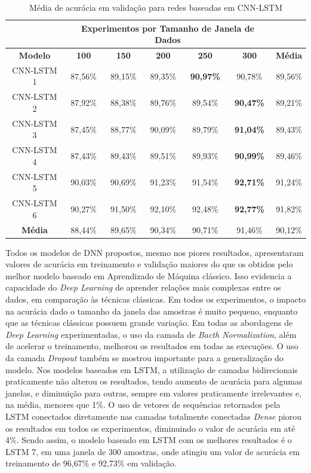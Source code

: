 \begin{table}[H]
\scriptsize
\centering
\caption{Média de acurácia em validação para redes baseadas em CNN-LSTM} 
\label{table:cnn_lstm_results_tipo_superficie_1}
\begin{tabular}{ccccccc}
\cmidrule(lr){2-6}
& \multicolumn{5}{c}{\textbf{Experimentos por Tamanho de Janela de Dados}} & \multicolumn{1}{c}{} \\ \midrule
\textbf{Modelo} & \textbf{100} & \textbf{150} & \textbf{200} & \textbf{250} & \textbf{300} & \textbf{Média} \\ \midrule
CNN-LSTM 1 & 87,56\% & 89,15\% & 89,35\% & \textbf{90,97\%} & 90,78\% & 89,56\% \\ \midrule
CNN-LSTM 2 & 87,92\% & 88,38\% & 89,76\% & 89,54\% & \textbf{90,47\%} & 89,21\% \\ \midrule
CNN-LSTM 3 & 87,45\% & 88,77\% & 90,09\% & 89,79\% & \textbf{91,04\%} & 89,43\% \\ \midrule
CNN-LSTM 4 & 87,43\% & 89,43\% & 89,51\% & 89,93\% & \textbf{90,99\%} & 89,46\% \\ \midrule
CNN-LSTM 5 & 90,03\% & 90,69\% & 91,23\% & 91,54\% & \textbf{92,71\%} & 91,24\% \\ \midrule
CNN-LSTM 6 & 90,27\% & 91,50\% & 92,10\% & 92,48\% &\cellcolor[HTML]{34FF34}\textbf{92,77\%} & 91,82\% \\ \midrule
\textbf{Média} & 88,44\% & 89,65\% & 90,34\% & 90,71\% & 91,46\% & 90,12\% \\ \bottomrule
\end{tabular}
\end{table}

Todos os modelos de DNN propostos, mesmo nos piores resultados, apresentaram valores de acurácia em treinamento e validação maiores do que os obtidos pelo melhor modelo baseado em Aprendizado de Máquina clássico. Isso evidencia a capacidade do \textit{Deep Learning} de aprender relações mais complexas entre os dados, em comparação às técnicas clássicas. Em todos os experimentos, o impacto na acurácia dado o tamanho da janela das amostras é muito pequeno, enquanto que as técnicas clássicas possuem grande variação. Em todas as abordagens de \textit{Deep Learning} experimentadas, o uso da camada de \textit{Bacth Normalization}, além de acelerar o treinamento, melhorou os resultados em todas as execuções. O uso da camada \textit{Dropout} também se mostrou importante para a generalização do modelo. Nos modelos baseados em LSTM, a utilização de camadas bidirecionais praticamente não alterou os resultados, tendo aumento de acurácia para algumas janelas, e diminuição para outras, sempre em valores praticamente irrelevantes e, na média, menores que 1\%. O uso de vetores de sequências retornados pela LSTM conectados diretamente nas camadas totalmente conectadas \textit{Dense} piorou os resultados em todos os experimentos, diminuindo o valor de acurácia em até 4\%. Sendo assim, o modelo baseado em LSTM com os melhores resultados é o LSTM 7, em uma janela de 300 amostras, onde atingiu um valor de acurácia em treinamento de 96,67\% e 92,73\% em validação.

